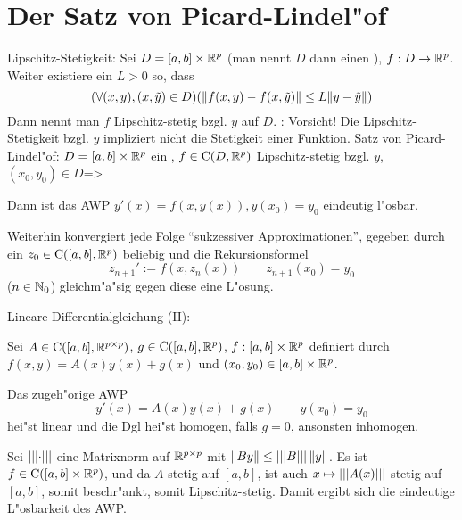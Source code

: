 \section{Der Satz von Picard-Lindel"of}
 Lipschitz-Stetigkeit:{
   Sei $D=[a,b]\times\mathbb R^p$ (man nennt $D$ dann einen ),
   $f:D\to\mathbb R^p$. Weiter existiere ein $L>0$ so, dass
   \[(\forall (x,y),(x,\tilde y)\in D)({\left\| f(x,y)-f(x,\tilde y)\right\|}\leq L{\left\| y-\tilde y\right\|})
     \]
   Dann nennt man $f$ Lipschitz-stetig bzgl. $y$ auf $D$.
   }
\remark:{
  Vorsicht! Die Lipschitz-Stetigkeit bzgl. $y$ impliziert nicht die
  Stetigkeit einer Funktion.
  }
\theorem Satz von Picard-Lindel"of:
  $D=[a,b]\times\mathbb R^p$ ein , $f\in{\rm C}(D,\mathbb R^p)$
  Lipschitz-stetig bzgl. $y$, $(x_0,y_0)\in D$=>{
  \label{the:picard}
  Dann ist das AWP $y'(x)=f(x,y(x)),y(x_0)=y_0$ eindeutig l"osbar.
  
  Weiterhin konvergiert jede Folge ``sukzessiver Approximationen'',
  gegeben durch ein $z_0\in{\rm C}([a,b],\mathbb R^p)$ beliebig und
  die Rekursionsformel
  \[z_{n+1}':=f(x,z_n(x))\qquad z_{n+1}(x_0)=y_0
    \]
  ($n\in\mathbb N_0$) gleichm"a"sig gegen diese eine L"osung.
  }
 Lineare Differentialgleichung (II):{
%
%
%
%
%
%
  Sei $A\in{\rm C}([a,b],\mathbb R^{p\times p})$, $g\in{\rm C}([a,b],\mathbb R^p)$,
  $f:[a,b]\times \mathbb R^p$ definiert durch $f(x,y)=A(x)y(x)+g(x)$ und
  $(x_0,y_0)\in[a,b]\times\mathbb R^p$.
  
  Das zugeh"orige AWP
  \[y'(x)=A(x)y(x)+g(x)\qquad y(x_0)=y_0
    \]
  hei"st linear und die Dgl hei"st homogen, falls $g=0$, ansonsten inhomogen.
  
  Sei ${\left|\left|\left|\cdot\right|\right|\right|}$ eine Matrixnorm auf $\mathbb R^{p\times p}$ mit
  ${\left\| By\right\|}\leq{\left|\left|\left|B\right|\right|\right|}\,{\left\| y\right\|}$. Es ist $f\in{\rm C}([a,b]\times\mathbb R^p)$,
  und da $A$ stetig auf $[a,b]$, ist auch $x\mapsto{\left|\left|\left|A(x)\right|\right|\right|}$ stetig auf
  $[a,b]$, somit beschr"ankt, somit Lipschitz-stetig.
  Damit ergibt sich die eindeutige L"osbarkeit des AWP.
  }
